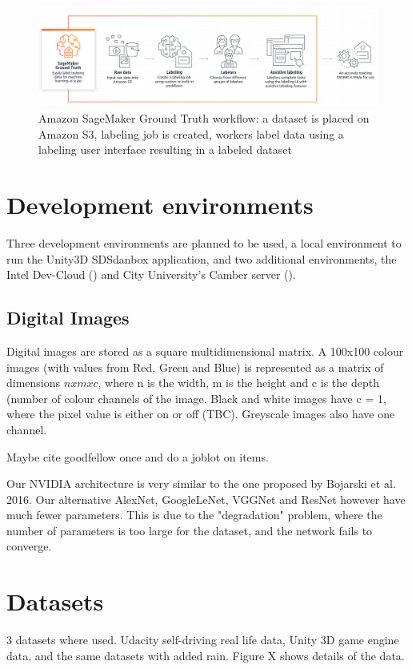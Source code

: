 \begin{figure}[ht]
 \centering 
 \includegraphics[width=\textwidth]{Figures/SageMakerGroundTruth.png}
 \caption{Amazon SageMaker Ground Truth workflow: a dataset is placed on Amazon S3, labeling job is created, workers label data using a labeling user interface resulting in a labeled dataset}
 \label{fig:amazon-ground-truth}
\end{figure}

\section{Development environments}

Three development environments are planned to be used, a local environment to run the Unity3D SDSdanbox application, and two additional environments, the Intel Dev-Cloud (\cite{IntelDevCloud2020}) and City University's Camber server (\cite{Camber2019}).

\subsection{Digital Images}
Digital images are stored as a square multidimensional matrix. A 100x100 colour images (with values from Red, Green and Blue) is represented as a matrix of dimensions $n x m x c$, where n is the width, m is the height and c is the depth (number of colour channels of the image. Black and white images have c = 1, where the pixel value is either on or off (TBC). Greyscale images also have one channel.

Maybe cite goodfellow once and do a joblot on items.  

Our NVIDIA architecture is very similar to the one proposed by Bojarski et al. 2016. Our alternative AlexNet, GoogleLeNet, VGGNet and ResNet however have much fewer parameters. This is due to the "degradation" problem, where the number of parameters is too large for the dataset, and the network fails to converge.

\section{Datasets}
3 datasets where used. Udacity self-driving real life data, Unity 3D game engine data, and the same datasets with added rain. Figure X shows details of the data.

